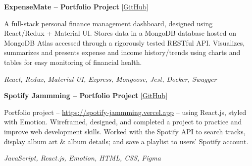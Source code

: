 \documentclass[12pt, a4paper]{article}
\begin{document}
%



\textbf{ExpenseMate -- Portfolio Project}	\hfill [\href{https://github.com/m-usaid99/ExpenseMate}{GitHub}]
\begin{center}
	\parbox{0.9\linewidth}{
		A full-stack \href{https://expensemate.vercel.app}{personal finance management dashboard}, designed using React/Redux + Material UI. Stores data in a MongoDB database hosted on MongoDB Atlas accessed through a rigorously tested RESTful API. Visualizes, summarizes and presents expense and income history/trends using charts and tables for easy monitoring of financial health.

		\textit{React, Redux, Material UI, Express, Mongoose, Jest, Docker, Swagger}
	}
\end{center}


\textbf{ Spotify Jammming -- Portfolio Project} \hfill [\href{https://github.com/m-usaid99/spotify-jammming}{GitHub}]
\begin{center}
	\parbox{0.9\linewidth}{
		Portfolio project -- \url{https://spotify-jammming.vercel.app} -- using React.js, styled with Emotion. Wireframed, designed, and completed a project to practice and improve web development skills. Worked with the Spotify API to search tracks, display album art \& album details; and save a playlist to users' Spotify account.

		\textit{JavaScript, React.js, Emotion, HTML, CSS, Figma}
	}
\end{center}
\end{document}
